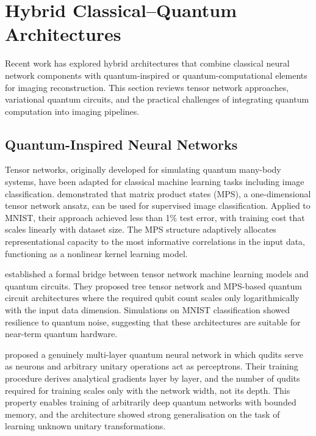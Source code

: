 \section{Hybrid Classical--Quantum Architectures}
\label{sec:hybrid}

Recent work has explored hybrid architectures that combine classical neural network components with quantum-inspired or quantum-computational elements for imaging reconstruction. This section reviews tensor network approaches, variational quantum circuits, and the practical challenges of integrating quantum computation into imaging pipelines.

\subsection{Quantum-Inspired Neural Networks}

Tensor networks, originally developed for simulating quantum many-body systems, have been adapted for classical machine learning tasks including image classification. \citet{stoudenmire2016} demonstrated that matrix product states (MPS), a one-dimensional tensor network ansatz, can be used for supervised image classification. Applied to MNIST, their approach achieved less than 1\% test error, with training cost that scales linearly with dataset size. The MPS structure adaptively allocates representational capacity to the most informative correlations in the input data, functioning as a nonlinear kernel learning model.

\citet{huggins2019} established a formal bridge between tensor network machine learning models and quantum circuits. They proposed tree tensor network and MPS-based quantum circuit architectures where the required qubit count scales only logarithmically with the input data dimension. Simulations on MNIST classification showed resilience to quantum noise, suggesting that these architectures are suitable for near-term quantum hardware.

\citet{beer2020} proposed a genuinely multi-layer quantum neural network in which qudits serve as neurons and arbitrary unitary operations act as perceptrons. Their training procedure derives analytical gradients layer by layer, and the number of qudits required for training scales only with the network width, not its depth. This property enables training of arbitrarily deep quantum networks with bounded memory, and the architecture showed strong generalisation on the task of learning unknown unitary transformations.

